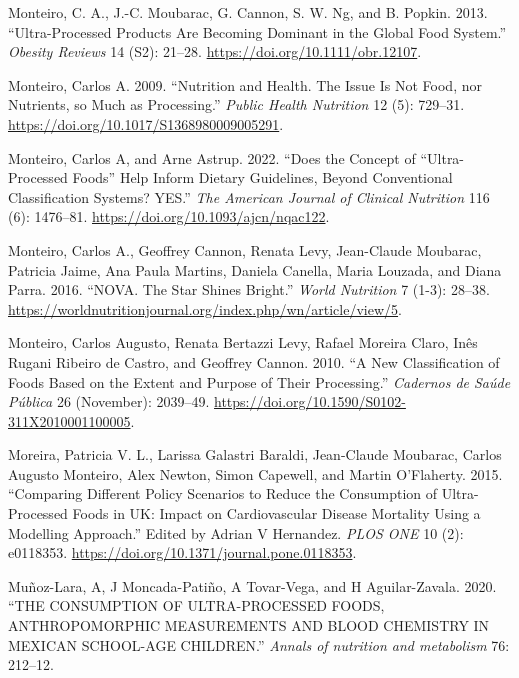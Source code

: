 \documentclass[
]{article}
\newlength{\cslhangindent}
\newlength{\cslentryspacingunit} %
\newenvironment{CSLReferences}[2] %
 {%
  \setlength{\parindent}{0pt}
  \ifodd #1
  \let\oldpar\par
  \def\par{\hangindent=\cslhangindent\oldpar}
  \fi
  \setlength{\parskip}{#2\cslentryspacingunit}
 }%
 {}
\begin{document}
\begin{CSLReferences}{1}{0}
\leavevmode{}%
Monteiro, C. A., J.-C. Moubarac, G. Cannon, S. W. Ng, and B. Popkin.
2013. {``Ultra-Processed Products Are Becoming Dominant in the Global
Food System.''} \emph{Obesity Reviews} 14 (S2): 21--28.
\url{https://doi.org/10.1111/obr.12107}.

\leavevmode{}%
Monteiro, Carlos A. 2009. {``Nutrition and Health. The Issue Is Not
Food, nor Nutrients, so Much as Processing.''} \emph{Public Health
Nutrition} 12 (5): 729--31.
\url{https://doi.org/10.1017/S1368980009005291}.

\leavevmode{}%
Monteiro, Carlos A, and Arne Astrup. 2022. {``Does the Concept of
{``}Ultra-Processed Foods{''} Help Inform Dietary Guidelines, Beyond
Conventional Classification Systems? YES.''} \emph{The American Journal
of Clinical Nutrition} 116 (6): 1476--81.
\url{https://doi.org/10.1093/ajcn/nqac122}.

\leavevmode{}%
Monteiro, Carlos A., Geoffrey Cannon, Renata Levy, Jean-Claude Moubarac,
Patricia Jaime, Ana Paula Martins, Daniela Canella, Maria Louzada, and
Diana Parra. 2016. {``NOVA. The Star Shines Bright.''} \emph{World
Nutrition} 7 (1-3): 28--38.
\url{https://worldnutritionjournal.org/index.php/wn/article/view/5}.

\leavevmode{}%
Monteiro, Carlos Augusto, Renata Bertazzi Levy, Rafael Moreira Claro,
Inês Rugani Ribeiro de Castro, and Geoffrey Cannon. 2010. {``A New
Classification of Foods Based on the Extent and Purpose of Their
Processing.''} \emph{Cadernos de Saúde Pública} 26 (November): 2039--49.
\url{https://doi.org/10.1590/S0102-311X2010001100005}.

\leavevmode{}%
Moreira, Patricia V. L., Larissa Galastri Baraldi, Jean-Claude Moubarac,
Carlos Augusto Monteiro, Alex Newton, Simon Capewell, and Martin
O'Flaherty. 2015. {``Comparing Different Policy Scenarios to Reduce the
Consumption of Ultra-Processed Foods in UK: Impact on Cardiovascular
Disease Mortality Using a Modelling Approach.''} Edited by Adrian V
Hernandez. \emph{PLOS ONE} 10 (2): e0118353.
\url{https://doi.org/10.1371/journal.pone.0118353}.

\leavevmode{}%
Muñoz-Lara, A, J Moncada-Patiño, A Tovar-Vega, and H Aguilar-Zavala.
2020. {``THE CONSUMPTION OF ULTRA-PROCESSED FOODS, ANTHROPOMORPHIC
MEASUREMENTS AND BLOOD CHEMISTRY IN MEXICAN SCHOOL-AGE CHILDREN.''}
\emph{Annals of nutrition and metabolism} 76: 212--12.


\end{CSLReferences}
\end{document}
